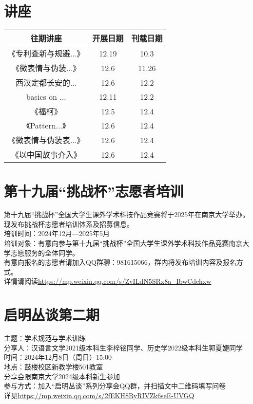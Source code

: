 \documentclass[letterpaper, 12pt]{article}
\begin{document}
\begin{multicols}{2}

\section{讲座}
\begin{tabular}{|c|c|c|}
    \hline
    往期讲座 & 开展日期 & 刊载日期\\
    \hline\hline
    《专利查新与规避...》 & 12.19 & 10.3\\
    《微表情与伪装...》 & 12.6 & 11.26\\
    西汉定都长安的... & 12.6 & 12.2\\
    basics on ... & 12.11 & 12.2\\
    《福柯》 & 12.5 & 12.4\\
    《Pattern...》 & 12.6 & 12.4\\
    《微表情与伪装表...》 & 12.6 & 12.4\\
    《以中国故事介入》 & 12.6 & 12.4\\
    \hline
\end{tabular}

\section{第十九届“挑战杯”志愿者培训}
第十九届“挑战杯”全国大学生课外学术科技作品竞赛将于2025年在南京大学举办。现发布挑战杯志愿者培训体系及招募信息。\\
培训时间：2024年12月—2025年5月\\
培训对象：有意向参与第十九届“挑战杯”全国大学生课外学术科技作品竞赛南京大学志愿服务的全体同学。\\
有意向报名的志愿者请加入QQ群聊：981615066，群内将发布培训内容及报名方式。\\
详情请阅读\url{https://mp.weixin.qq.com/s/ZvILdN5SRx8a_IbwCdchxw}\\


\section{启明丛谈第二期}
主题：学术规范与学术训练\\
分享人：汉语言文学2021级本科生李梓铭同学、历史学2022级本科生郭夏婕同学\\
时间：2024年12月8日（周日）15:00\\
地点：鼓楼校区新教学楼501教室\\
分享会限南京大学2024级本科新生参加\\
参与方式：加入“启明丛谈”系列分享会QQ群，并扫描文中二维码填写问卷\\
详见\url{https://mp.weixin.qq.com/s/2fEKH8RyRIVZk6seE-UVGQ}




\end{multicols}
\end{document}

